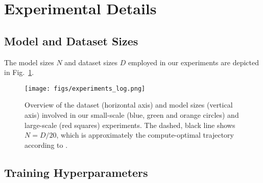 \section{Experimental Details}
\subsection{Model and Dataset Sizes}
\label{app:experiments_overview}

The model sizes $N$ and dataset sizes $D$ employed in our experiments are depicted in Fig.~\ref{fig:experiments}.
\begin{figure}[h!]
    \centering
    \texttt{[image: figs/experiments\_log.png]}
    \caption{Overview of the dataset (horizontal axis) and model sizes (vertical axis) involved in our small-scale (blue, green and orange circles) and large-scale (red squares) experiments. The dashed, black line shows $N = D / 20$, which is approximately the compute-optimal trajectory according to \citet{hoffmann2022trainingcomputeoptimallargelanguage}.}
    \label{fig:experiments}
\end{figure}


\subsection{Training Hyperparameters}
\label{app:hyperparameters}

